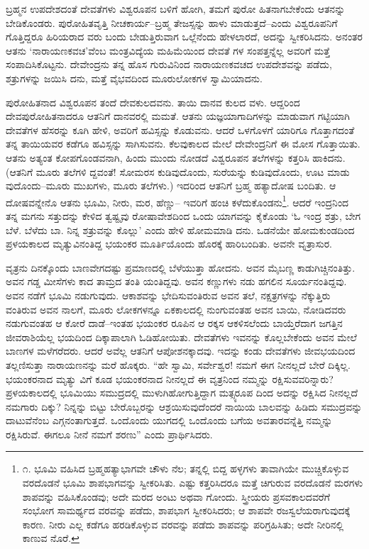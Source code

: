 ಬ್ರಹ್ಮನ ಉಪದೇಶದಂತೆ ದೇವತೆಗಳು ವಿಶ್ವರೂಪನ ಬಳಿಗೆ ಹೋಗಿ, ತಮಗೆ ಪುರೋ ಹಿತನಾಗಬೇಕೆಂದು ಆತನನ್ನು ಬೇಡಿಕೊಂಡರು. ಪುರೋಹಿತವೃತ್ತಿ ನೀಚಕಾರ್ಯ–ಬ್ರಹ್ಮ ತೇಜಸ್ಸನ್ನು ಹಾಳು ಮಾಡುತ್ತದೆ–ಎಂದು ವಿಶ್ವರೂಪನಿಗೆ ಗೊತ್ತಿದ್ದರೂ ಹಿರಿಯರಾದ ವರು ಬಂದು ಬೇಡುತ್ತಿರುವಾಗ ಒಲ್ಲೆನೆಂದು ಹೇಳಲಾರದೆ, ಅದನ್ನು ಸ್ವೀಕರಿಸಿದನು. ಅನಂತರ ಆತನು ‘ನಾರಾಯಣಕವಚ’ವೆಂಬ ಮಂತ್ರವಿದ್ಯೆಯ ಮಹಿಮೆಯಿಂದ ದೇವತೆ ಗಳ ಸಂಪತ್ತನ್ನೆಲ್ಲ ಅವರಿಗೆ ಮತ್ತೆ ಸಂಪಾದಿಸಿಕೊಟ್ಟನು. ದೇವೇಂದ್ರನು ತನ್ನ ಹೊಸ ಗುರುವಿನಿಂದ ನಾರಾಯಣಕವಚದ ಉಪದೇಶವನ್ನು ಪಡೆದು, ಶತ್ರುಗಳನ್ನು ಜಯಿಸಿ ದನು, ಮತ್ತೆ ವೈಭವದಿಂದ ಮೂರುಲೋಕಗಳ ಸ್ವಾಮಿಯಾದನು.

ಪುರೋಹಿತನಾದ ವಿಶ್ವರೂಪನ ತಂದೆ ದೇವಕುಲದವನು. ತಾಯಿ ದಾನವ ಕುಲದ ವಳು. ಆದ್ದರಿಂದ ದೇವಪುರೋಹಿತನಾದರೂ ಆತನಿಗೆ ದಾನವರಲ್ಲಿ ಮಮತೆ. ಆತನು ಯಜ್ಞಯಾಗಾದಿಗಳನ್ನು ಮಾಡುವಾಗ ಗಟ್ಟಿಯಾಗಿ ದೇವತೆಗಳ ಹೆಸರನ್ನು ಕೂಗಿ ಹೇಳಿ, ಅವರಿಗೆ ಹವಿಸ್ಸನ್ನು ಕೊಡುವನು. ಆದರೆ ಒಳಗೊಳಗೆ ಯಾರಿಗೂ ಗೊತ್ತಾಗದಂತೆ ತನ್ನ ತಾಯಿಯವರ ಕಡೆಗೂ ಹವಿಸ್ಸನ್ನು ಸಾಗಿಸುವನು. ಕೆಲವುಕಾಲದ ಮೇಲೆ ದೇವೇಂದ್ರನಿಗೆ ಈ ಮೋಸ ಗೊತ್ತಾಯಿತು. ಆತನು ಅತ್ಯಂತ ಕೋಪಗೊಂಡವನಾಗಿ, ಹಿಂದು ಮುಂದು ನೋಡದೆ ವಿಶ್ವರೂಪನ ತಲೆಗಳನ್ನು ಕತ್ತರಿಸಿ ಹಾಕಿದನು. (ಆತನಿಗೆ ಮೂರು ತಲೆಗಳಿ ದ್ದವಂತೆ! ಸೋಮರಸ ಕುಡಿವುದೊಂದು, ಸುರೆಯನ್ನು ಕುಡಿವುದೊಂದು, ಊಟ ಮಾಡು ವುದೊಂದು–ಮೂರು ಮುಖಗಳು, ಮೂರು ತಲೆಗಳು.) ಇದರಿಂದ ಆತನಿಗೆ ಬ್ರಹ್ಮ ಹತ್ಯಾದೋಷ ಬಂದಿತು. ಆ ದೋಷವನ್ನೇನೊ ಆತನು ಭೂಮಿ, ನೀರು, ಮರ, ಹೆಣ್ಣು– ಇವರಿಗೆ ಹಂಚಿ ಕಳೆದುಕೊಂಡನು\footnote{೧. ಭೂಮಿ ವಹಿಸಿದ ಬ್ರಹ್ಮಹತ್ಯಾಭಾಗವೇ ಚೌಳು ನೆಲ; ತನ್ನಲ್ಲಿ ಬಿದ್ದ ಹಳ್ಳಗಳು ತಾವಾಗಿಯೇ ಮುಚ್ಚಿಕೊಳ್ಳುವ ವರದೊಡನೆ ಭೂಮಿ ಶಾಪಭಾಗವನ್ನು ಸ್ವೀಕರಿಸಿತು. ಎಷ್ಟು ಕತ್ತರಿಸಿದರೂ ಮತ್ತೆ ಚಿಗುರುವ ವರದೊಡನೆ ಮರಗಳು ಶಾಪವನ್ನು ವಹಿಸಿಕೊಂಡವು; ಅದೇ ಮರದ ಅಂಟು ಅಥವಾ ಗೋಂದು. ಸ್ತ್ರೀಯರು ಪ್ರಸವಕಾಲದವರೆಗೆ ಸಂಭೋಗ ಸಾಮರ್ಥ್ಯದ ವರವನ್ನು ಪಡೆದು, ಶಾಪಭಾಗ ಸ್ವೀಕರಿಸಿದರು; ಆ ಶಾಪವೇ ರಜಸ್ವಲೆಯರಾಗುವುದಕ್ಕೆ ಕಾರಣ. ನೀರು ಎಲ್ಲ ಕಡೆಗೂ ಹರಡಿಕೊಳ್ಳುವ ವರವನ್ನು ಪಡೆದು ಶಾಪವನ್ನು ಪರಿಗ್ರಹಿಸಿತು; ಅದೇ ನೀರಿನಲ್ಲಿ ಕಾಣುವ ನೊರೆ.}. ಆದರೆ ಇಂದ್ರನಿಂದ ತನ್ನ ಮಗನು ಸತ್ತುದನ್ನು ಕೇಳಿದ ತ್ವಷ್ಟೃವು ರೋಷಾವೇಶದಿಂದ ಒಂದು ಯಾಗವನ್ನು ಕೈಕೊಂಡು ‘ಓ ಇಂದ್ರ ಶತ್ರು, ಬೇಗ ಬೆಳೆ. ಬೆಳೆದು ಬಾ. ನಿನ್ನ ಶತ್ರುವನ್ನು ಕೊಲ್ಲು’ ಎಂದು ಹೇಳಿ ಹೋಮಮಾಡಿ ದನು. ಒಡನೆಯೇ ಹೋಮಕುಂಡದಿಂದ ಪ್ರಳಯಕಾಲದ ಮೃತ್ಯುವಿನಂತಿದ್ದ ಭಯಂಕರ ಮೂರ್ತಿಯೊಂದು ಹೊರಕ್ಕೆ ಹಾರಿಬಂದಿತು. ಅವನೇ ವೃತ್ರಾಸುರ.

ವೃತ್ರನು ದಿನಕ್ಕೊಂದು ಬಾಣವೇಗದಷ್ಟು ಪ್ರಮಾಣದಲ್ಲಿ ಬೆಳೆಯುತ್ತಾ ಹೋದನು. ಅವನ ಮೈಬಣ್ಣ ಕಾಡುಗಿಚ್ಚಿನಂತಿತ್ತು. ಅವನ ಗಡ್ಡ ಮೀಸೆಗಳು ಕಾದ ತಾಮ್ರದ ತಂತಿ ಯಂತಿದ್ದವು. ಅವನ ಕಣ್ಣುಗಳು ನಡು ಹಗಲಿನ ಸೂರ್ಯನಂತಿದ್ದವು. ಅವನ ನಡೆಗೆ ಭೂಮಿ ನಡುಗುವುದು. ಆಕಾಶವನ್ನು ಭೇದಿಸುವಂತಿರುವ ಅವನ ತಲೆ, ನಕ್ಷತ್ರಗಳನ್ನು ನೆಕ್ಕುತ್ತಿರು ವಂತಿರುವ ಅವನ ನಾಲಗೆ, ಮೂರು ಲೋಕಗಳನ್ನೂ ಏಕಕಾಲದಲ್ಲಿ ನುಂಗುವಂತಹ ಅವನ ಬಾಯಿ, ನೋಡಿದವರು ನಡುಗುವಂತಹ ಆ ಕೋರೆ ದಾಡೆ–ಇಂತಹ ಭಯಂಕರ ರೂಪಿನ ಆ ರಕ್ಕಸ ಆಕಳಿಸಲೆಂದು ಬಾಯ್ತೆರೆದಾಗ ಜಗತ್ತಿನ ಜೀವರಾಶಿಯೆಲ್ಲ ಭಯದಿಂದ ದಿಕ್ಕಾಪಾಲಾಗಿ ಓಡಿಹೋಯಿತು. ದೇವತೆಗಳು ಇವನನ್ನು ಕೊಲ್ಲಬೇಕೆಂದು ಅವನ ಮೇಲೆ ಬಾಣಗಳ ಮಳೆಗರೆದರು. ಆದರೆ ಅವೆಲ್ಲ ಆತನಿಗೆ ಆಪೋಶನಕ್ಕಾದವು. ಇದನ್ನು ಕಂಡು ದೇವತೆಗಳು ಜೀವಭಯದಿಂದ ತಲ್ಲಣಿಸುತ್ತಾ ನಾರಾಯಣನನ್ನು ಮರೆ ಹೊಕ್ಕರು. “ಹೇ ಸ್ವಾಮಿ, ಸರ್ವೇಶ್ವರ! ನಮಗೆ ಈಗ ನೀನಲ್ಲದೆ ಬೇರೆ ದಿಕ್ಕಿಲ್ಲ. ಭಯಂಕರನಾದ ಮೃತ್ಯು ವಿಗೆ ಕೂಡ ಭಯಂಕರನಾದ ನೀನಲ್ಲದೆ ಈ ವೃತ್ರನಿಂದ ನಮ್ಮನ್ನು ರಕ್ಷಿಸುವವರಿನ್ನಾರು? ಪ್ರಳಯಕಾಲದಲ್ಲಿ ಭೂಮಿಯು ಸಮುದ್ರದಲ್ಲಿ ಮುಳುಗಿಹೋಗುತ್ತಿದ್ದಾಗ ಮತ್ಸ್ಯರೂಪ ದಿಂದ ಅದನ್ನು ರಕ್ಷಿಸಿದ ನೀನಲ್ಲದೆ ನಮಗಾರು ದಿಕ್ಕು? ನಿನ್ನನ್ನು ಬಿಟ್ಟು ಬೇರೊಬ್ಬರನ್ನು ಆಶ್ರಯಿಸುವುದೆಂದರೆ ನಾಯಿಯ ಬಾಲವನ್ನು ಹಿಡಿದು ಸಮುದ್ರವನ್ನು ದಾಟುವೆನೆಂಬ ಎಗ್ಗನಂತಾಗುತ್ತದೆ. ಒಂದೊಂದು ಯುಗದಲ್ಲಿ ಒಂದೊಂದು ಬಗೆಯ ಅವತಾರವನ್ನೆತ್ತಿ ನಮ್ಮನ್ನು ರಕ್ಷಿಸಿರುವೆ. ಈಗಲೂ ನೀನೆ ನಮಗೆ ಶರಣು” ಎಂದು ಪ್ರಾರ್ಥಿಸಿದರು.

